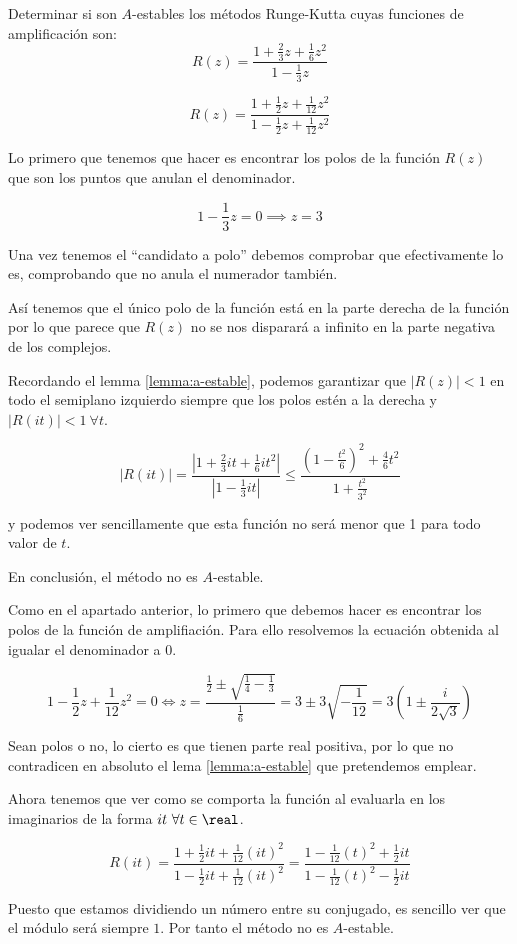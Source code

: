 \begin{problem}[4]
Determinar si son $A$-estables los métodos Runge-Kutta cuyas funciones de amplificación son:
\ppart
\[R(z)=\frac{1+\frac{2}{3}z+\frac{1}{6}z^2}{1-\frac{1}{3}z}\]

\ppart
\[R(z)=\frac{1+\frac{1}{2}z+\frac{1}{12}z^2}{1-\frac{1}{2}z + \frac{1}{12}z^2}\]
\solution

\spart

Lo primero que tenemos que hacer es encontrar los polos de la función $R(z)$ que son los puntos que anulan el denominador.

\[1-\frac{1}{3}z=0\implies z=3\]

Una vez tenemos el ``candidato a polo'' debemos comprobar que efectivamente lo es, comprobando que no anula el numerador también.

Así tenemos que el único polo de la función está en la parte derecha de la función por lo que parece que $R(z)$ no se nos disparará a infinito en la parte negativa de los complejos.

Recordando el lemma \ref{lemma:a-estable}, podemos garantizar que $|R(z)|<1$ en todo el semiplano izquierdo siempre que los polos estén a la derecha y $|R(it)| < 1 \ \forall t$.

\[|R(it)| = \frac{|1+\frac{2}{3}it+\frac{1}{6}it^2|}{|1-\frac{1}{3}it|}\leq \frac{\left(1-\frac{t^2}{6}\right)^2 + \frac{4}{6}t^2}{1+\frac{t^2}{3^2}}\]

y podemos ver sencillamente que esta función no será menor que 1 para todo valor de $t$.

En conclusión, el método no es $A$-estable.

\spart

Como en el apartado anterior, lo primero que debemos hacer es encontrar los polos de la función de amplifiación. Para ello resolvemos la ecuación obtenida al igualar el denominador a 0.

\[1-\frac{1}{2}z + \frac{1}{12}z^2 = 0 \iff z=\frac{\frac{1}{2}\pm \sqrt{\frac{1}{4}-\frac{1}{3}}}{\frac{1}{6}}=3 \pm 3\sqrt{-\frac{1}{12}}=3\left(1\pm \frac{i}{2\sqrt{3}}\right)\]

Sean polos o no, lo cierto es que tienen parte real positiva, por lo que no contradicen en absoluto el lema \ref{lemma:a-estable} que pretendemos emplear.

Ahora tenemos que ver como se comporta la función al evaluarla en los imaginarios de la forma $it \ \forall t \in \real$.

\[R(it) = \frac{1+\frac{1}{2}it+\frac{1}{12}(it)^2}{1-\frac{1}{2}it + \frac{1}{12}(it)^2}=\frac{1-\frac{1}{12}(t)^2+\frac{1}{2}it}{1 - \frac{1}{12}(t)^2-\frac{1}{2}it}\]

Puesto que estamos dividiendo un número entre su conjugado, es sencillo ver que el módulo será siempre $1$. Por tanto el método no es $A$-estable.
\end{problem}

